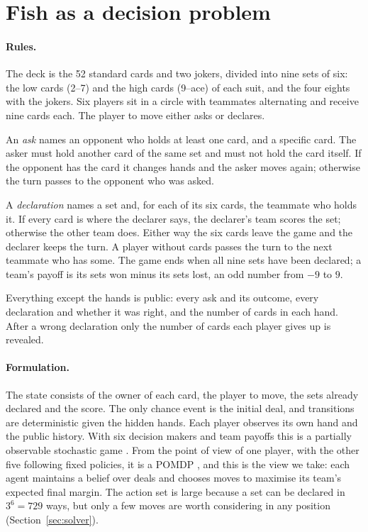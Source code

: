\documentclass{article}
\begin{document}
\section{Fish as a decision problem}
\label{sec:game}

\paragraph{Rules.}
The deck is the 52 standard cards and two jokers, divided into nine sets of
six: the low cards (2--7) and the high cards (9--ace) of each suit, and the
four eights with the jokers.  Six players sit in a circle with
teammates alternating and receive nine cards each.  The player to move either
asks or declares.

An \emph{ask} names an opponent who holds at least one card, and a specific
card.  The asker must hold another card of the same set and must not hold the
card itself.  If the opponent has the card it changes hands and the asker moves
again; otherwise the turn passes to the opponent who was asked.

A \emph{declaration} names a set and, for each of its six cards, the teammate
who holds it.  If every card is where the declarer says, the declarer's team
scores the set; otherwise the other team does.  Either way the six cards leave
the game and the declarer keeps the turn.  A player without cards passes the
turn to the next teammate who has some.  The game ends when all nine sets have
been declared; a team's payoff is its sets won minus its sets lost, an odd
number from $-9$ to $9$.

Everything except the hands is public: every ask and its outcome, every
declaration and whether it was right, and the number of cards in each hand.
After a wrong declaration only the number of cards each player gives up is
revealed.

\paragraph{Formulation.}
The state consists of the owner of each card, the player to move, the sets
already declared and the score.  The only chance event is the initial deal, and
transitions are deterministic given the hidden hands.  Each player observes its
own hand and the public history.  With six decision makers and team payoffs
this is a partially observable stochastic game \citep{hansen2004}.  From the
point of view of one player, with the other five following fixed policies, it
is a POMDP \citep{kaelbling1998}, and this is the view we take: each agent
maintains a belief over deals and chooses moves to maximise its team's expected
final margin.  The action set is large because a set can be declared in
$3^6 = 729$ ways, but only a few moves are worth considering in any position
(Section~\ref{sec:solver}).
\end{document}
